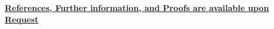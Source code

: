 \documentclass[11pt,letter,sans]{moderncv} %
\newcommand*{\authorimg}[1]{%
	\raisebox{-.25\baselineskip}{%
		\texttt{[image: \#1]}%
	}%
}
\begin{document}
\begin{multicols}{2}
\begin{itemize}
            
            
            
            
            
        \end{itemize}
    \end{multicols}


	
    
 
\vspace{2.0em}

\centerline{\underline{\textbf{	\faExclamationCircle \hspace{0.5 pt} References, Further information, and Proofs are available upon Request}}}
  
\end{document}
